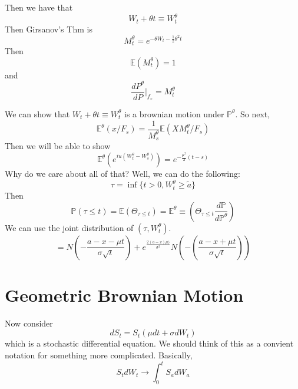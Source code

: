 Then we have that
\begin{equation}
	W_t + \theta t \equiv W_t^\theta
\end{equation}
Then Girsanov's Thm is 
\begin{equation}
	M_t^\theta = e^{-\theta W_t - \frac{1}{2}\theta^2t}
\end{equation}
Then
\begin{equation}
	\mathbb{E}(M_t^\theta) = 1
\end{equation}
and
\begin{equation}
	\frac{dP^\theta}{dP}|_{f_x} = M^\theta_t
\end{equation}

We can show that $W_t + \theta t \equiv W_t^\theta$ is a brownian motion under $\mathbb{P}^\theta$. So next,
\begin{equation}
	\mathbb{E}^\theta \left( x / F_s\right) = \frac{1}{M^\theta_s} \mathbb{E}(X M^\theta_t / F_s) 
\end{equation}
Then we will be able to show
\begin{equation}
	\mathbb{E}^\theta \left( e^{iu(W_t^\theta - W_s^\theta)} \right) = e^{-\frac{\mu^2}{2}(t-s)}
\end{equation}
Why do we care about all of that? Well, we can do the following:
\begin{equation}
	\tau = \inf \{ t> 0, W_t^\theta \geq \tilde{a} \}
\end{equation}
Then
\begin{equation}
	\mathbb{P}(\tau \leq t) = \mathbb{E}(\Theta_{\tau \leq t}) = \mathbb{E}^\theta \equiv \left( \Theta_{\tau \leq t} \frac{d\mathbb{P}}{d\mathbb{P}^\theta} \right)
\end{equation}
We can use the joint distribution of $(\tau, W_t^\theta)$.
\begin{equation}
	= N( -\frac{a - x - \mu t}{\sigma \sqrt{t}}) + e^{\frac{2(a-x)\mu)}{\sigma^2}} N(-\left( \frac{a - x + \mu t}{\sigma \sqrt{t}}\right))
\end{equation}

\section{Geometric Brownian Motion}
Now consider
\begin{equation}
	dS_t = S_t (\mu dt + \sigma dW_t)
\end{equation}
which is a stochastic differential equation. We should think of this as a convient notation for something more complicated. Basically,
\begin{equation}
	S_t dW_t \to \int_0^t S_a dW_a
\end{equation}

